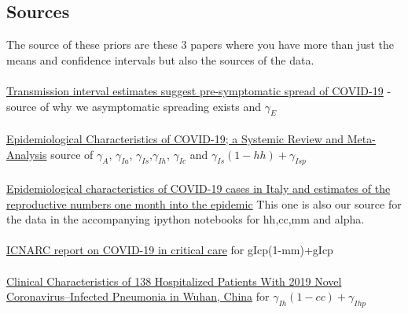 \documentclass[10pt]{article}
\begin{document}
\subsection{Sources}
The source of these priors are these 3 papers where you have more than just the means and confidence intervals but also the sources of the data.\\
\\
\href{https://www.medrxiv.org/content/10.1101/2020.03.03.20029983v1}{Transmission interval estimates suggest pre-symptomatic spread of COVID-19} -source of why we asymptomatic spreading exists and $\gamma_{E}$\\
\\
\href{https://www.medrxiv.org/content/10.1101/2020.04.01.20050138v1.full.pdf}{Epidemiological Characteristics of COVID-19; a Systemic Review and Meta-Analysis} source of $\gamma_{A}$, $\gamma_{Ia}$, $\gamma_{Is}$,$\gamma_{Ih}$,  $\gamma_{Ic}$ and
$\gamma_{Is}(1-hh)+\gamma_{Isp}$\\
\\
\href{https://www.medrxiv.org/content/10.1101/2020.04.08.20056861v1.full.pdf}{Epidemiological characteristics of COVID-19 cases in Italy and estimates of the reproductive numbers one month into the epidemic} This one is also our source for the data in the accompanying ipython notebooks for hh,cc,mm and alpha.\\
\\
\href{https://www.icnarc.org/DataServices/Attachments/Download/76a7364b-4b76-ea11-9124-00505601089b}{ICNARC report on COVID-19 in critical care} for gIcp(1-mm)+gIcp\\
\\
\href{https://jamanetwork.com/journals/jama/fullarticle/2761044}{Clinical Characteristics of 138 Hospitalized Patients With 2019 Novel Coronavirus–Infected Pneumonia in Wuhan, China} for $\gamma_{Ih}(1-cc)+\gamma_{Ihp}$
\end{document}
